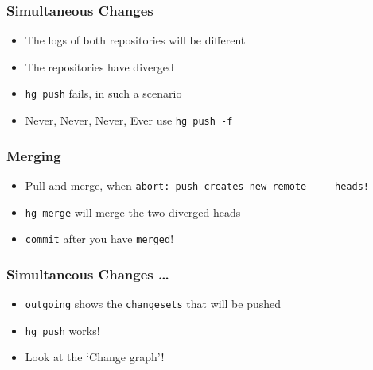 \documentclass[12pt,compress]{beamer}
\newcommand{\typ}[1]{\lstinline{#1}}
\begin{document}
\begin{frame}
  \frametitle{Simultaneous Changes}
\label{sec-8}

  \begin{itemize}
  \item The logs of both repositories will be different
  \item The repositories have diverged
  \item \typ{hg push} fails, in such a scenario
  \item \alert{Never, Never, Never, Ever} use \typ{hg push -f}
  \end{itemize}
\end{frame}

\begin{frame}
  \frametitle{Merging}
\label{sec-9}

  \begin{itemize}
  \item Pull and merge, when \typ{abort: push creates new remote
    heads!}
  \item \typ{hg merge} will merge the two diverged heads
  \item \typ{commit} after you have \typ{merged}!
  \end{itemize}
\end{frame}

\begin{frame}
  \frametitle{Simultaneous Changes \ldots}
\label{sec-10}

  \begin{itemize}
  \item \typ{outgoing} shows the \typ{changesets} that will be pushed
  \item \typ{hg push} works!
  \item Look at the `Change graph'!
  \end{itemize}
\end{frame}
\end{document}
